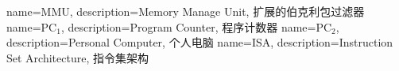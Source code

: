  {
    name={MMU},
    description={Memory Manage Unit, 扩展的伯克利包过滤器}
}
 {
    name={PC${}_{1}$},
    description={Program Counter, 程序计数器}
}
 {
    name={PC${}_{2}$},
    description={Personal Computer, 个人电脑}
}
 {
	name={ISA}, 
	description={Instruction Set Architecture, 指令集架构}
}
